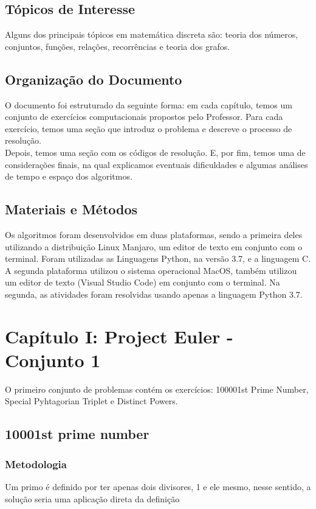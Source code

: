 \documentclass{article}
\begin{document}
    \subsection{Tópicos de Interesse}
    Alguns dos principais tópicos em matemática discreta são: teoria dos números, conjuntos, funções, relações, recorrências e teoria dos grafos.
    
    \subsection{Organização do Documento}
    O documento foi estruturado da seguinte forma: em cada capítulo, temos um conjunto de exercícios computacionais propostos pelo Professor. Para cada exercício, temos uma seção que introduz o problema e descreve o processo de resolução.\\
    Depois, temos uma seção com os códigos de resolução. E, por fim, temos uma de considerações finais, na qual explicamos eventuais dificuldades e algumas análises de tempo e espaço dos algoritmos.\\
    
    \subsection{Materiais e Métodos}
    Os algoritmos foram desenvolvidos em duas plataformas, sendo a primeira deles utilizando a distribuição Linux Manjaro, um editor de texto em conjunto com o terminal. Foram utilizadas as Linguagens Python, na versão 3.7, e a linguagem C. A segunda plataforma utilizou o sistema operacional MacOS, também utilizou um editor de texto (Visual Studio Code) em conjunto com o terminal. Na segunda, as atividades foram resolvidas usando apenas a linguagem Python 3.7.

\section{Capítulo I: Project Euler - Conjunto 1}
O primeiro conjunto de problemas contém os exercícios: 100001st Prime Number, Special Pyhtagorian Triplet e Distinct Powers.
    \subsection{10001st prime number }
       
        \subsubsection{Metodologia} 
        Um primo é definido por ter apenas dois divisores, 1 e ele mesmo, nesse sentido, a solução seria uma aplicação direta da definição
       
\end{document}
